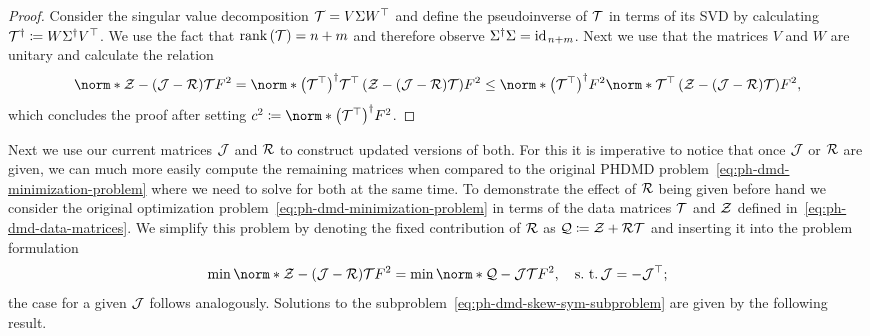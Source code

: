 \begin{proof}
    Consider the singular value decomposition $\mcl{T} = V \Sigma W\trans$ and define the pseudoinverse of $\mcl{T}$ in terms of its SVD by calculating $\mcl{T}^\dagger \coloneqq W \Sigma^\dagger V\trans$.
    We use the fact that $\rank{\mcl{T}} = n + m$ and therefore observe $\Sigma^\dagger \Sigma = \id[n + m]$.
    Next we use that the matrices $V$ and $W$ are unitary and calculate the relation
    \begin{equation*}
        \norm*{\mcl{Z} - ( \mcl{J} - \mcl{R}) \mcl{T}}{F}^2 = \norm*{{\left( \mcl{T}\trans \right)}^\dagger \mcl{T}\trans \left( \mcl{Z} - ( \mcl{J} - \mcl{R}) \mcl{T} \right)}{F}^2 \leq \norm*{{\left( \mcl{T}\trans \right)}^\dagger}{F}^2 \norm*{\mcl{T}\trans \left( \mcl{Z} - ( \mcl{J} - \mcl{R}) \mcl{T} \right)}{F}^2,
    \end{equation*}
    which concludes the proof after setting $c^2 \coloneqq \norm*{{\left( \mcl{T}\trans \right)}^\dagger}{F}^2$.
\end{proof}

Next we use our current matrices $\mcl{J}$ and $\mcl{R}$ to construct updated versions of both.
For this it is imperative to notice that once $\mcl{J}$ or $\mcl{R}$ are given, we can much more easily compute the remaining matrices when compared to the original \ac{PHDMD} problem~\eqref{eq:ph-dmd-minimization-problem} where we need to solve for both at the same time.
To demonstrate the effect of $\mcl{R}$ being given before hand we consider the original optimization problem~\eqref{eq:ph-dmd-minimization-problem} in terms of the data matrices $\mcl{T}$ and $\mcl{Z}$ defined in~\eqref{eq:ph-dmd-data-matrices}.
We simplify this problem by denoting the fixed contribution of $\mcl{R}$ as $\mcl{Q} \coloneqq \mcl{Z} + \mcl{R} \mcl{T}$ and inserting it into the problem formulation
\begin{equation}\label{eq:ph-dmd-skew-sym-subproblem}
    \min \norm*{\mcl{Z} - (\mcl{J} - \mcl{R}) \mcl{T}}{F}^2 = \min \norm*{\mcl{Q} - \mcl{J} \mcl{T}}{F}^2,\quad \suchthat \mcl{J} = - \mcl{J}\trans;
\end{equation}
the case for a given $\mcl{J}$ follows analogously.
Solutions to the subproblem~\eqref{eq:ph-dmd-skew-sym-subproblem} are given by the following result.

